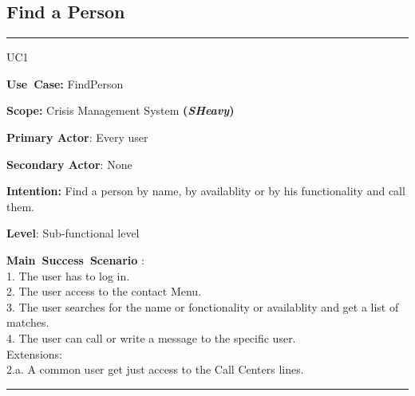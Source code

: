 \subsection{Find a Person}
\vspace{0.5cm}
\hrule
\vspace{0.5cm}
\begin{lyxlist}{UC1}
\small{
\item [\textbf{Use~Case:}] FindPerson
\item [\textbf{Scope:}] Crisis Management System \textbf{(\emph{SHeavy})}
\item [\textbf{Primary Actor}:] Every user
\item [\textbf{Secondary Actor}:] None
\item [\textbf{Intention:}]Find a person by name, by availablity or by his
functionality and call them.
\item [\textbf{Level}:]Sub-functional level
\item [\textbf{Main~Success~Scenario}]:\\
1. The user has to log in.\\
2. The user access to the contact Menu.\\
3. The user searches for the name or fonctionality or availablity and get a list
of matches.\\
4. The user can call or write a message to the specific user.\\
Extensions:\\ 
	2.a. A common user get just access to the Call Centers lines.\\
}
\end{lyxlist}
\hrule 
\vspace{0.5cm} 

